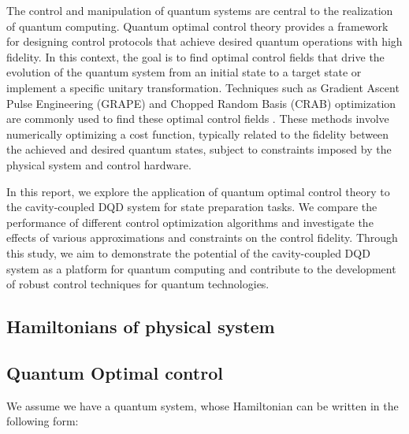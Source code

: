 \documentclass{article}
\begin{document}
The control and manipulation of quantum systems are central to the realization of quantum computing. Quantum optimal control theory provides a framework for designing control protocols that achieve desired quantum operations with high fidelity. In this context, the goal is to find optimal control fields that drive the evolution of the quantum system from an initial state to a target state or implement a specific unitary transformation. Techniques such as Gradient Ascent Pulse Engineering (GRAPE) and Chopped Random Basis (CRAB) optimization are commonly used to find these optimal control fields \cite{khaneja2005, cai2011}. These methods involve numerically optimizing a cost function, typically related to the fidelity between the achieved and desired quantum states, subject to constraints imposed by the physical system and control hardware.

In this report, we explore the application of quantum optimal control theory to the cavity-coupled DQD system for state preparation tasks. We compare the performance of different control optimization algorithms and investigate the effects of various approximations and constraints on the control fidelity. Through this study, we aim to demonstrate the potential of the cavity-coupled DQD system as a platform for quantum computing and contribute to the development of robust control techniques for quantum technologies.


\subsection{Hamiltonians of physical system}

\subsection{Quantum Optimal control}
We assume we have a quantum system, whose Hamiltonian can be written in the following form: 
\end{document}
